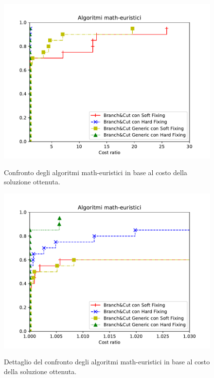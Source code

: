 \begin{figure}[h] 
\begin{center} 
  \includegraphics[scale=0.8]{Images/pp_math-heuristic}\\ 
  \caption{\footnotesize{Confronto degli algoritmi math-euristici in base al costo della soluzione ottenuta.}}
  \label{pp_math-heuristic} 
\end{center} 
\end{figure}

\begin{figure}[h] 
\begin{center} 
  \includegraphics[scale=0.8]{Images/pp_math-heuristic_zoom}\\ 
  \caption{\footnotesize{Dettaglio del confronto degli algoritmi math-euristici in base al costo della soluzione ottenuta.}}
  \label{pp_math-heuristic_zoom} 
\end{center} 
\end{figure}
\vspace{10cm}
